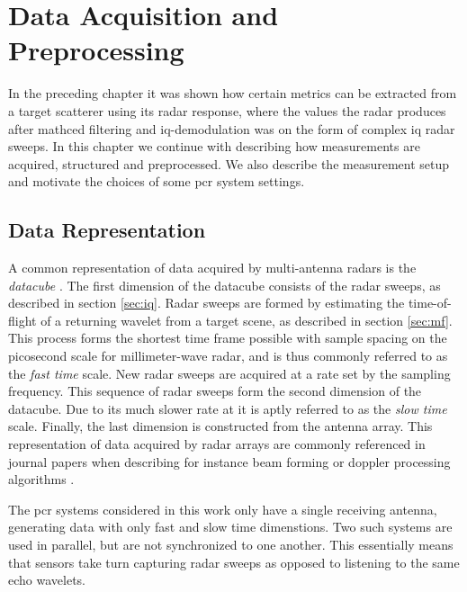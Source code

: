 \chapter{Data Acquisition and Preprocessing}\label{ch:3}

In the preceding chapter it was shown how certain metrics can be extracted from a target scatterer using its radar response, where the values the radar produces after mathced filtering and \gls{iq}-demodulation was on the form of complex \gls{iq} radar sweeps. In this chapter we continue with describing how measurements are acquired, structured and preprocessed. We also describe the measurement setup and motivate the choices of some \gls{pcr} system settings.

\section{Data Representation}

A common representation of data acquired by multi-antenna radars is the \emph{datacube} \citep{richards_2014}. The first dimension of the datacube consists of the radar sweeps, as described in section \ref{sec:iq}. Radar sweeps are formed by estimating the time-of-flight of a returning wavelet from a target scene, as described in section \ref{sec:mf}. This process forms the shortest time frame possible with sample spacing on the picosecond scale for millimeter-wave radar, and is thus commonly referred to as the \emph{fast time} scale. New radar sweeps are acquired at a rate set by the sampling frequency. This sequence of radar sweeps form the second dimension of the datacube. Due to its much slower rate at it is aptly referred to as the \emph{slow time} scale. Finally, the last dimension is constructed from the antenna array. This representation of data acquired by radar arrays are commonly referenced in journal papers when describing for instance beam forming or doppler processing algorithms \citep{gentile_donovan_2018}. 



The \gls{pcr} systems considered in this work only have a single receiving antenna, generating data with only fast and slow time dimenstions. Two such systems are used in parallel, but are not synchronized to one another. This essentially means that sensors take turn capturing radar sweeps as opposed to listening to the same echo wavelets. %

